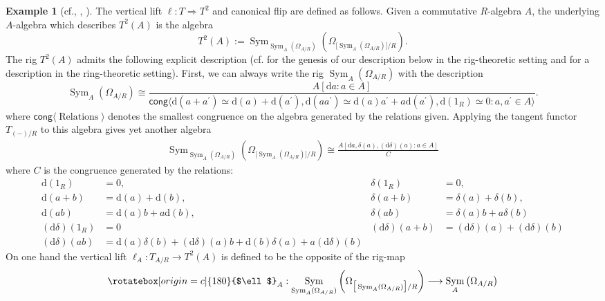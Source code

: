 \documentclass{amsart}
\theoremstyle{definition}
\newtheorem{example}[equation]{Example}
\DeclareMathOperator{\sym}{Sym}
\newcommand{\Sym}[1]{\sym_{#1}}
\newcommand{\Kah}[2]{\Omega_{{#1}/{#2}}}
\numberwithin{equation}{subsection}
\begin{document}
\begin{example}[{cf.\@ \cite[Example 4.2]{GeoffJSDiffBunComAlg}, \cite{RobinMePartialMapRigs}, \cite{JSMeMapFlavoursInTanCats}}]
	The vertical lift $\ell:T \Rightarrow T^2$ and canonical flip are defined as follows. Given a commutative $R$-algebra $A$, the underlying $A$-algebra which describes $T^2(A)$ is the algebra
	\[
	T^2(A) := \Sym{\Sym{A}(\Kah{A}{R})}\left(\Kah{\big[\Sym{A}(\Kah{A}{R})\big]}{R}\right).
	\] 
	The rig $T^2(A)$ admits the following explicit description (cf.\@ \cite{RobinMePartialMapRigs} for the genesis of our description below in the rig-theoretic setting and \cite{GeoffRobinDiffStruct} for a description in the ring-theoretic setting). First, we can always write the rig $\Sym{A}(\Kah{A}{R})$ with the description
	\[
	\Sym{A}(\Kah{A}{R}) \cong \frac{A[\mathrm{d}a:a \in A]}{\mathsf{cong}\langle\mathrm{d}(a+a^{\prime}) \simeq \mathrm{d}(a) + \mathrm{d}(a^{\prime}), \mathrm{d}(aa^{\prime}) \simeq \mathrm{d}(a)a^{\prime} + a\mathrm{d}(a^{\prime}), \mathrm{d}(1_R) \simeq 0: a, a^{\prime} \in A\rangle}.
	\]
	where $\mathsf{cong}\langle \operatorname{Relations}\rangle$ denotes the smallest congruence on the algebra generated by the relations given. Applying the tangent functor $T_{(-)/R}$ to this algebra gives yet another algebra
	\begin{align*}
		\Sym{\Sym{A}(\Kah{A}{R})}\left(\Kah{\big[\Sym{A}(\Kah{A}{R})\big]}{R}\right) \cong \frac{A[\mathrm{d}a, \delta(a), (\mathrm{d}\delta)(a):a \in A]}{C}
	\end{align*}
	where $C$ is the congruence generated by the relations:
	\begin{align}
	\label{Eqn: First of the T2 rels}	\mathrm{d}(1_R) &= 0, & \delta(1_R) &= 0, \\
	\label{Eqn: Second of the T2 rels}	\mathrm{d}(a+b) &= \mathrm{d}(a) + \mathrm{d}(b), & \delta(a+b) &= \delta(a) + \delta(b), \\
	\label{Eqn: Third of the T2 rels}	\mathrm{d}(ab) &= \mathrm{d}(a)b + a\mathrm{d}(b), & \delta(ab) &= \delta(a)b + a\delta(b) \\
	\label{Eqn: Fourth of the T2 rels}	(\mathrm{d}\delta)(1_R) &= 0 & (\mathrm{d}\delta)(a+b) &= (\mathrm{d}\delta)(a) + (\mathrm{d}\delta)(b) \\
	\label{Eqn: Fifth of the T2 rels}	(\mathrm{d}\delta)(ab) &= \mathrm{d}(a)\delta(b) + (\mathrm{d}\delta)(a)b + \mathrm{d}(b)\delta(a) + a(\mathrm{d}\delta)(b)
	\end{align}
	On one hand the vertical lift $\ell_A:T_{A/R} \to T^2(A)$ is defined to be the opposite of the rig-map
	\begin{equation}\label{Eqn: Section Tangent: Tangent Structure of Affine VertLift Map}
	\rotatebox[origin = c]{180}{$\ell$}_A:\Sym{\Sym{A}(\Kah{A}{R})}\left(\Kah{\big[\Sym{A}(\Kah{A}{R})\big]}{R}\right) \longrightarrow \Sym{A}\left(\Kah{A}{R}\right)

\end{equation}
\end{example}
\end{document}
